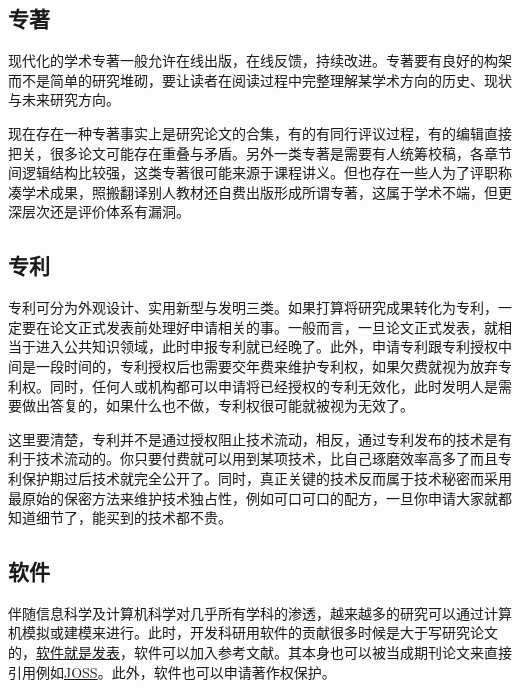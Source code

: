 \documentclass[]{tufte-book}
\begin{document}
\hypertarget{ux4e13ux8457}{%
\subsection{专著}\label{ux4e13ux8457}}

现代化的学术专著一般允许在线出版，在线反馈，持续改进。专著要有良好的构架而不是简单的研究堆砌，要让读者在阅读过程中完整理解某学术方向的历史、现状与未来研究方向。

现在存在一种专著事实上是研究论文的合集，有的有同行评议过程，有的编辑直接把关，很多论文可能存在重叠与矛盾。另外一类专著是需要有人统筹校稿，各章节间逻辑结构比较强，这类专著很可能来源于课程讲义。但也存在一些人为了评职称凑学术成果，照搬翻译别人教材还自费出版形成所谓专著，这属于学术不端，但更深层次还是评价体系有漏洞。

\hypertarget{ux4e13ux5229}{%
\subsection{专利}\label{ux4e13ux5229}}

专利可分为外观设计、实用新型与发明三类。如果打算将研究成果转化为专利，一定要在论文正式发表前处理好申请相关的事。一般而言，一旦论文正式发表，就相当于进入公共知识领域，此时申报专利就已经晚了。此外，申请专利跟专利授权中间是一段时间的，专利授权后也需要交年费来维护专利权，如果欠费就视为放弃专利权。同时，任何人或机构都可以申请将已经授权的专利无效化，此时发明人是需要做出答复的，如果什么也不做，专利权很可能就被视为无效了。

这里要清楚，专利并不是通过授权阻止技术流动，相反，通过专利发布的技术是有利于技术流动的。你只要付费就可以用到某项技术，比自己琢磨效率高多了而且专利保护期过后技术就完全公开了。同时，真正关键的技术反而属于技术秘密而采用最原始的保密方法来维护技术独占性，例如可口可口的配方，一旦你申请大家就都知道细节了，能买到的技术都不贵。

\hypertarget{ux8f6fux4ef6}{%
\subsection{软件}\label{ux8f6fux4ef6}}

伴随信息科学及计算机科学对几乎所有学科的渗透，越来越多的研究可以通过计算机模拟或建模来进行。此时，开发科研用软件的贡献很多时候是大于写研究论文的，\href{https://simplystatistics.org/2018/05/03/software-as-an-academic-publication/}{软件就是发表}，软件可以加入参考文献。其本身也可以被当成期刊论文来直接引用例如\href{http://joss.theoj.org/}{JOSS}。此外，软件也可以申请著作权保护。
\end{document}
